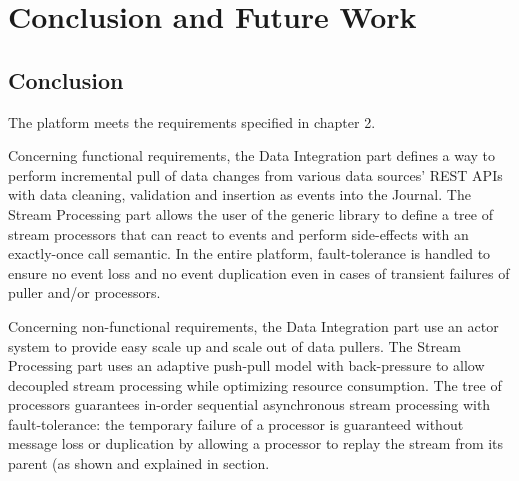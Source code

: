 \chapter{Conclusion and Future Work}

\section{Conclusion}

The platform meets the requirements specified in chapter 2. 

Concerning functional requirements, the Data Integration part defines a way to perform incremental pull of data changes from various data sources' REST APIs with data cleaning, validation and insertion as events into the Journal. The Stream Processing part allows the user of the generic library to define a tree of stream processors that can react to events and perform side-effects with an exactly-once call semantic. In the entire platform, fault-tolerance is handled to ensure no event loss and no event duplication even in cases of transient failures of puller and/or processors.

Concerning non-functional requirements, the Data Integration part use an actor system to provide easy scale up and scale out of data pullers. The Stream Processing part uses an adaptive push-pull model with back-pressure to allow decoupled stream processing while optimizing resource consumption. The tree of processors guarantees in-order sequential asynchronous stream processing with fault-tolerance: the temporary failure of a processor is guaranteed without message loss or duplication by allowing a processor to replay the stream from its parent (as shown and explained in section.
\\

